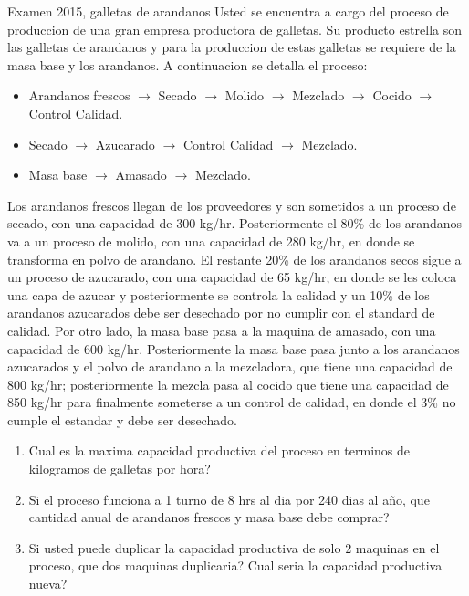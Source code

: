 \begin{enunciado}{Examen 2015, galletas de arandanos}
Usted se encuentra a cargo del proceso de produccion de una gran empresa productora de galletas. Su producto estrella son las galletas de arandanos y para la produccion de estas galletas se requiere de la masa base y los arandanos. A continuacion se detalla el proceso:

\begin{itemize}
  \item Arandanos frescos $\rightarrow$ Secado $\rightarrow$ Molido $\rightarrow$ Mezclado $\rightarrow$ Cocido $\rightarrow$ Control Calidad.
  \item Secado $\rightarrow$ Azucarado $\rightarrow$ Control Calidad $\rightarrow$ Mezclado.
  \item Masa base $\rightarrow$ Amasado $\rightarrow$ Mezclado.
\end{itemize}

Los arandanos frescos llegan de los proveedores y son sometidos a un proceso de secado, con una capacidad de 300 kg/hr. Posteriormente el 80\% de los arandanos va a un proceso de molido, con una capacidad de 280 kg/hr, en donde se transforma en polvo de arandano. El restante 20\% de los arandanos secos sigue a un proceso de azucarado, con una capacidad de 65 kg/hr, en donde se les coloca una capa de azucar y posteriormente se controla la calidad y un 10\% de los arandanos azucarados debe ser desechado por no cumplir con el standard de calidad. Por otro lado, la masa base pasa a la maquina de amasado, con una capacidad de 600 kg/hr. Posteriormente la masa base pasa junto a los arandanos azucarados y el polvo de arandano a la mezcladora, que tiene una capacidad de 800 kg/hr; posteriormente la mezcla pasa al cocido que tiene una capacidad de 850 kg/hr para finalmente someterse a un control de calidad, en donde el 3\% no cumple el estandar y debe ser desechado.

\begin{enumerate}[label=\alph*)]
  \item Cual es la maxima capacidad productiva del proceso en terminos de kilogramos de galletas por hora?
  \item Si el proceso funciona a 1 turno de 8 hrs al dia por 240 dias al año, que cantidad anual de arandanos frescos y masa base debe comprar?
  \item Si usted puede duplicar la capacidad productiva de solo 2 maquinas en el proceso, que dos maquinas duplicaria? Cual seria la capacidad productiva nueva?
\end{enumerate}
\end{enunciado}

